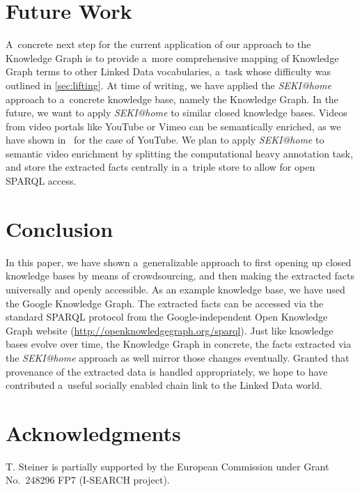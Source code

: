 \documentclass[runningheads,a4paper]{llncs}
\begin{document}
\section{Future Work} \label{sec:future-work}
A~concrete next step for the current application
of our approach to the Knowledge Graph is
to provide a~more comprehensive mapping
of Knowledge Graph terms to other Linked Data vocabularies,
a~task whose difficulty was outlined in \autoref{sec:lifting}.
At time of writing, we have applied the \emph{SEKI@home} approach
to a~concrete knowledge base, namely the Knowledge Graph.
In the future, we want to apply \emph{SEKI@home} to
similar closed knowledge bases.
Videos from video portals like YouTube or Vimeo can be semantically enriched,
as we have shown in~\cite{steiner2010} for the case of YouTube.
We plan to apply \emph{SEKI@home} to semantic video enrichment by splitting
the computational heavy annotation task,
and store the extracted facts centrally in a~triple store
to allow for open SPARQL access.

\section{Conclusion} \label{sec:conclusion}
In this paper, we have shown a~generalizable approach
to first opening up closed knowledge bases by means of crowdsourcing,
and then making the extracted facts universally and openly accessible.
As an example knowledge base, we have used the Google Knowledge Graph.
The extracted facts can be accessed via the standard SPARQL protocol
from the Google-independent Open Knowledge Graph website
(\url{http://openknowledgegraph.org/sparql}).
Just like knowledge bases evolve over time, the Knowledge Graph in concrete,
the facts extracted via the \emph{SEKI@home} approach as well
mirror those changes eventually.
Granted that provenance of the extracted data is handled appropriately,
we hope to have contributed a~useful socially enabled chain link
to the Linked Data world.

\section*{Acknowledgments}
T. Steiner is partially supported by the European Commission
under Grant No.~248296 FP7 (\mbox{I-SEARCH} project).



\end{document}
